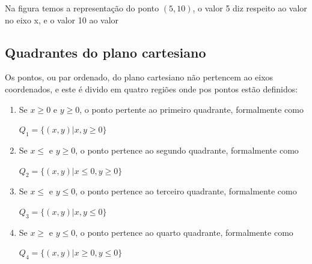 \begin{multicols*}{2}
    Na figura temos a representação do ponto $(5,10)$, o valor 5 diz respeito ao valor no eixo x, e o valor 10 ao valor
    \subsection*{Quadrantes do plano cartesiano}
    Os pontos, ou par ordenado, do plano cartesiano não pertencem ao eixos coordenados, e este é divido em quatro regiões onde pos pontos estão definidos:
    \begin{enumerate}[wide, labelwidth=!, labelindent=0pt]
        \item Se $x \ge 0$ e $y \ge 0$, o ponto pertente ao primeiro quadrante, formalmente como

              $Q_1 = \{ (x,y)| x,y \ge 0 \}$
        \item Se $x \le $ e $ y \ge 0 $, o ponto pertence ao segundo quadrante, formalmente como

              $Q_2 = \{  (x,y) | x \le 0, y \ge 0 \}$

        \item Se $x \le $ e $ y \le 0 $, o ponto pertence ao terceiro quadrante, formalmente como

              $Q_3 = \{  (x,y) | x , y \le 0 \}$

        \item Se $x \ge $ e $ y \le 0 $, o ponto pertence ao quarto quadrante, formalmente como

              $Q_4 = \{  (x,y) | x \ge 0 ,y \le 0 \}$
    \end{enumerate}


\end{multicols*}
